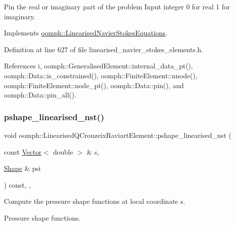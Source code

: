 Pin the real or imaginary part of the problem Input integer 0 for real 1 for imaginary. 



Implements \hyperlink{classoomph_1_1LinearisedNavierStokesEquations_a202921e1739b6aa174e1b64ebb1b14cd}{oomph\+::\+Linearised\+Navier\+Stokes\+Equations}.



Definition at line 627 of file linearised\+\_\+navier\+\_\+stokes\+\_\+elements.\+h.



References i, oomph\+::\+Generalised\+Element\+::internal\+\_\+data\+\_\+pt(), oomph\+::\+Data\+::is\+\_\+constrained(), oomph\+::\+Finite\+Element\+::nnode(), oomph\+::\+Finite\+Element\+::node\+\_\+pt(), oomph\+::\+Data\+::pin(), and oomph\+::\+Data\+::pin\+\_\+all().

\mbox{\label{classoomph_1_1LinearisedQCrouzeixRaviartElement_ad90494427c784a07e843d88748c72cee}} 
\subsubsection{\texorpdfstring{pshape\+\_\+linearised\+\_\+nst()}{pshape\_linearised\_nst()}\hspace{0.1cm}{\footnotesize\ttfamily [1/2]}}
{\footnotesize\ttfamily void oomph\+::\+Linearised\+Q\+Crouzeix\+Raviart\+Element\+::pshape\+\_\+linearised\+\_\+nst (\begin{DoxyParamCaption}\item[{const \hyperlink{classoomph_1_1Vector}{Vector}$<$ double $>$ \&}]{s,  }\item[{\hyperlink{classoomph_1_1Shape}{Shape} \&}]{psi }\end{DoxyParamCaption}) const\hspace{0.3cm}{\ttfamily [inline]}, {\ttfamily [protected]}, {\ttfamily [virtual]}}



Compute the pressure shape functions at local coordinate s. 

Pressure shape functions. 

